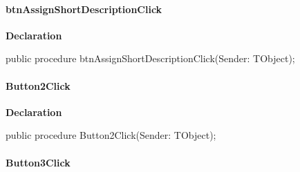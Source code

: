 \documentclass{report}
\newif\ifpdf
\begin{document}
\paragraph*{btnAssignShortDescriptionClick}\hspace*{\fill}

\label{prjwizard.TfrmProjectWizard-btnAssignShortDescriptionClick}
\begin{list}{}{
\setlength{\itemindent}{0cm}
\setlength{\listparindent}{0cm}
\setlength{\leftmargin}{\evensidemargin}
\addtolength{\leftmargin}{\tmplength}
\settowidth{\labelsep}{X}
\addtolength{\leftmargin}{\labelsep}
\setlength{\labelwidth}{\tmplength}
}
\item[\textbf{Declaration}\hfill]
\ifpdf
\begin{flushleft}
\fi
\begin{ttfamily}
public procedure btnAssignShortDescriptionClick(Sender: TObject);\end{ttfamily}

\ifpdf
\end{flushleft}
\fi

\end{list}
\paragraph*{Button2Click}\hspace*{\fill}

\label{prjwizard.TfrmProjectWizard-Button2Click}
\begin{list}{}{
\setlength{\itemindent}{0cm}
\setlength{\listparindent}{0cm}
\setlength{\leftmargin}{\evensidemargin}
\addtolength{\leftmargin}{\tmplength}
\settowidth{\labelsep}{X}
\addtolength{\leftmargin}{\labelsep}
\setlength{\labelwidth}{\tmplength}
}
\item[\textbf{Declaration}\hfill]
\ifpdf
\begin{flushleft}
\fi
\begin{ttfamily}
public procedure Button2Click(Sender: TObject);\end{ttfamily}

\ifpdf
\end{flushleft}
\fi

\end{list}
\paragraph*{Button3Click}\hspace*{\fill}
\end{document}
